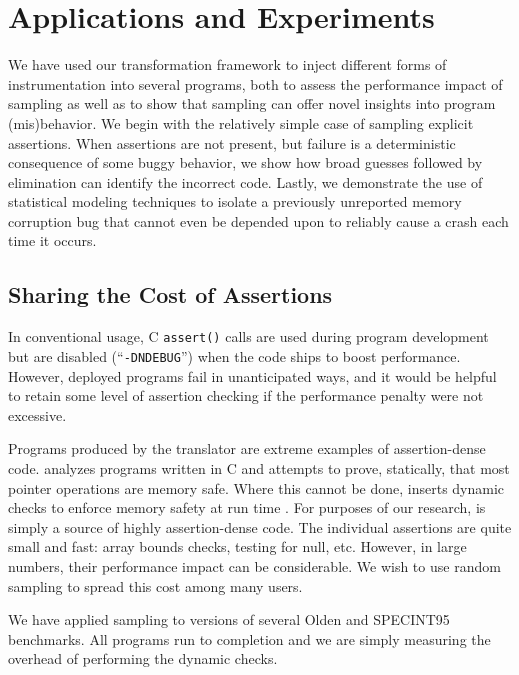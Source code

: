 \section{Applications and Experiments}
\label{sec:applications}

We have used our transformation framework to inject different forms of
instrumentation into several programs, both to assess the performance
impact of sampling as well as to show that sampling can offer novel
insights into program (mis)behavior.  We begin with the relatively
simple case of sampling explicit assertions.  When assertions are not
present, but failure is a deterministic consequence of some buggy
behavior, we show how broad guesses followed by elimination can
identify the incorrect code.  Lastly, we demonstrate the use of
statistical modeling techniques to isolate a previously unreported
memory corruption bug that cannot even be depended upon to reliably
cause a crash each time it occurs.

\subsection{Sharing the Cost of Assertions}
\label{sec:ccured}

In conventional usage, C \texttt{assert()} calls are used during
program development but are disabled (``\texttt{-DNDEBUG}'') when the
code ships to boost performance.  However, deployed programs fail in
unanticipated ways, and it would be helpful to retain some level of
assertion checking if the performance penalty were not excessive.

Programs produced by the \CCured translator are extreme examples of
assertion-dense code.  \CCured analyzes programs written in C and
attempts to prove, statically, that most pointer operations are memory
safe.  Where this cannot be done, \CCured inserts dynamic checks to
enforce memory safety at run time \cite{POPL_'02*128}.  For purposes
of our research, \CCured is simply a source of highly assertion-dense
code.  The individual assertions are quite small and fast: array
bounds checks, testing for null, etc.  However, in large numbers,
their performance impact can be considerable.  We wish to use random
sampling to spread this cost among many users.

We have applied sampling to \CCured versions of several Olden
\cite{Carlisle:1996:OPPWDDSDMM} and SPECINT95 \cite{SPEC95} benchmarks.
All programs run to completion and we are simply measuring
the overhead of performing the dynamic checks.

